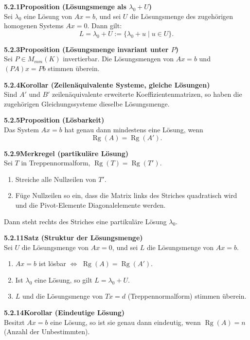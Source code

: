 \documentclass[a4paper,12pt]{article}
\newcommand{\gentry}[3]{%
  \noindent\textbf{#1\quad #2}\nopagebreak\\[0.2em]
  #3\par\smallskip
}
\begin{document}
\gentry{5.2.1}{Proposition (Lösungsmenge als $\lambda_0 + U$)}{%
  Sei $\lambda_0$ eine Lösung von $Ax = b$, und sei $U$ die Lösungsmenge des
  zugehörigen homogenen Systems $Ax = 0$. Dann gilt:
  \[
    L = \lambda_0 + U := \{\lambda_0 + u \mid u \in U\}.
  \]
}

\gentry{5.2.3}{Proposition (Lösungsmenge invariant unter $P$)}{%
  Sei $P \in M_{mm}(K)$ invertierbar. Die Lösungsmengen von $Ax = b$ und $(PA)x = Pb$ stimmen überein.
}

\gentry{5.2.4}{Korollar (Zeilenäquivalente Systeme, gleiche Lösungen)}{%
  Sind $A'$ und $B'$ zeilenäquivalente erweiterte Koeffizientenmatrizen, so
  haben die zugehörigen Gleichungssysteme dieselbe Lösungsmenge.
}

\gentry{5.2.5}{Proposition (Lösbarkeit)}{%
  Das System $Ax = b$ hat genau dann mindestens eine Lösung, wenn
  \[
    \operatorname{Rg}(A) = \operatorname{Rg}(A').
  \]
}

\gentry{5.2.9}{Merkregel (partikuläre Lösung)}{%
  Sei $T$ in Treppennormalform, $\operatorname{Rg}(T) = \operatorname{Rg}(T')$.
  \begin{enumerate}[label=\arabic*.,topsep=2pt,itemsep=1pt]
    \item Streiche alle Nullzeilen von $T'$.
    \item Füge Nullzeilen so ein, dass die Matrix links des Striches quadratisch
          wird und die Pivot-Elemente Diagonalelemente werden.
  \end{enumerate}
  Dann steht rechts des Striches eine partikuläre Lösung $\lambda_0$.
}

\gentry{5.2.11}{Satz (Struktur der Lösungsmenge)}{%
  Sei $U$ die Lösungsmenge von $Ax = 0$, und sei $L$ die Lösungsmenge von $Ax = b$.
  \begin{enumerate}[label=(\alph*),topsep=2pt,itemsep=1pt]
    \item $Ax = b$ ist lösbar $\iff$ $\operatorname{Rg}(A) = \operatorname{Rg}(A')$.
    \item Ist $\lambda_0$ eine Lösung, so gilt $L = \lambda_0 + U$.
    \item $L$ und die Lösungsmenge von $Tx = d$ (Treppennormalform) stimmen überein.
  \end{enumerate}
}

\gentry{5.2.14}{Korollar (Eindeutige Lösung)}{%
  Besitzt $Ax = b$ eine Lösung, so ist sie genau dann eindeutig, wenn
  $\operatorname{Rg}(A) = n$ (Anzahl der Unbestimmten).
}
\end{document}

